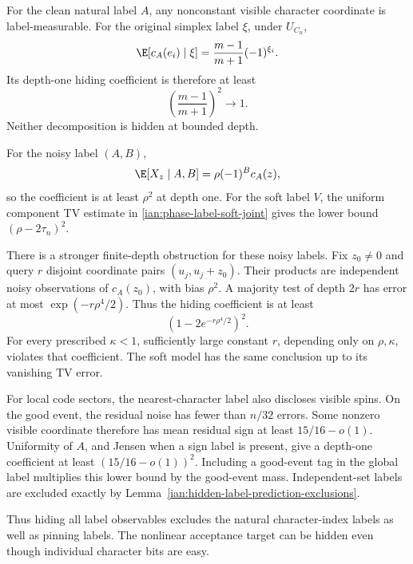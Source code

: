 \begin{remark}
\label{ian:hidden-label-natural-labels}
For the clean natural label \(A\), any nonconstant visible character coordinate is label-measurable. For the original simplex label \(\xi\), under \(U_{C_n}\),
\[
 \E[c_A(e_i)\mid\xi]
 =\frac{m-1}{m+1}(-1)^{\xi_i}.
\]
Its depth-one hiding coefficient is therefore at least
\[
 \left(\frac{m-1}{m+1}\right)^2\longrightarrow1.
\]
Neither decomposition is hidden at bounded depth.

For the noisy label \((A,B)\),
\[
 \E[X_z\mid A,B]=\rho(-1)^Bc_A(z),
\]
so the coefficient is at least \(\rho^2\) at depth one. For the soft label \(V\), the uniform component TV estimate in
\eqref{ian:phase-label-soft-joint} gives the lower bound
\((\rho-2\tau_n)^2\).

There is a stronger finite-depth obstruction for these noisy labels. Fix \(z_0\ne0\) and query \(r\) disjoint coordinate pairs
\((u_j,u_j+z_0)\). Their products are independent noisy observations of \(c_A(z_0)\), with bias \(\rho^2\). A majority test of depth \(2r\) has error at most
\(\exp(-r\rho^4/2)\). Thus the hiding coefficient is at least
\[
 \left(1-2e^{-r\rho^4/2}\right)^2.
\]
For every prescribed \(\kappa<1\), sufficiently large constant \(r\), depending only on \(\rho,\kappa\), violates that coefficient. The soft model has the same conclusion up to its vanishing TV error.

For local code sectors, the nearest-character label also discloses visible spins. On the good event, the residual noise has fewer than \(n/32\) errors. Some nonzero visible coordinate therefore has mean residual sign at least \(15/16-o(1)\). Uniformity of \(A\), and Jensen when a sign label is present, give a depth-one coefficient at least
\((15/16-o(1))^2\). Including a good-event tag in the global label multiplies this lower bound by the good-event mass. Independent-set labels are excluded exactly by
Lemma~\ref{ian:hidden-label-prediction-exclusions}.

Thus hiding all label observables excludes the natural character-index labels as well as pinning labels. The nonlinear acceptance target can be hidden even though individual character bits are easy.
\end{remark}

